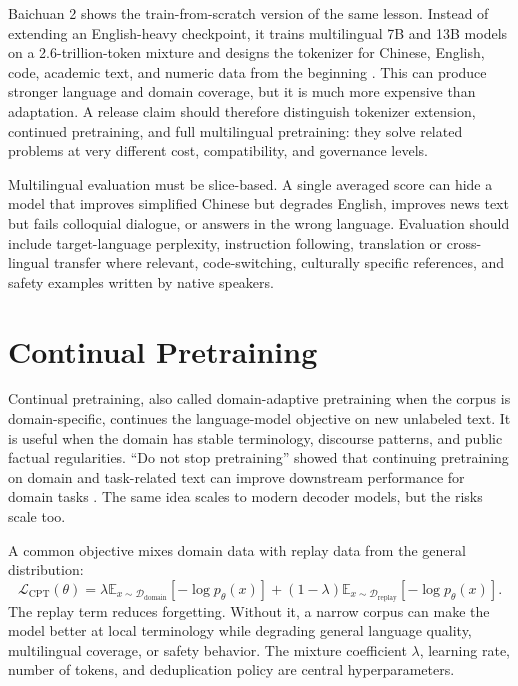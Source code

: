 Baichuan 2 shows the train-from-scratch version of the same lesson. Instead of extending an English-heavy checkpoint, it trains multilingual 7B and 13B models on a 2.6-trillion-token mixture and designs the tokenizer for Chinese, English, code, academic text, and numeric data from the beginning \cite{yang2023baichuan2}. This can produce stronger language and domain coverage, but it is much more expensive than adaptation. A release claim should therefore distinguish tokenizer extension, continued pretraining, and full multilingual pretraining: they solve related problems at very different cost, compatibility, and governance levels.

Multilingual evaluation must be slice-based. A single averaged score can hide a model that improves simplified Chinese but degrades English, improves news text but fails colloquial dialogue, or answers in the wrong language. Evaluation should include target-language perplexity, instruction following, translation or cross-lingual transfer where relevant, code-switching, culturally specific references, and safety examples written by native speakers.

\section{Continual Pretraining}
\label{sec:continual-pretraining}

Continual pretraining, also called domain-adaptive pretraining when the corpus is domain-specific, continues the language-model objective on new unlabeled text. It is useful when the domain has stable terminology, discourse patterns, and public factual regularities. ``Do not stop pretraining'' showed that continuing pretraining on domain and task-related text can improve downstream performance for domain tasks \cite{gururangan2020dont}. The same idea scales to modern decoder models, but the risks scale too.

A common objective mixes domain data with replay data from the general distribution:
\begin{equation}
  \mathcal{L}_{\mathrm{CPT}}(\theta)
  = \lambda \mathbb{E}_{x\sim \mathcal{D}_{\mathrm{domain}}}
    [-\log p_{\theta}(x)]
  + (1-\lambda)\mathbb{E}_{x\sim \mathcal{D}_{\mathrm{replay}}}
    [-\log p_{\theta}(x)].
  \label{eq:cpt-mixture}
\end{equation}
The replay term reduces forgetting. Without it, a narrow corpus can make the model better at local terminology while degrading general language quality, multilingual coverage, or safety behavior. The mixture coefficient $\lambda$, learning rate, number of tokens, and deduplication policy are central hyperparameters.

